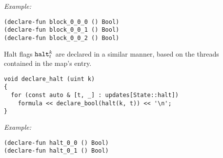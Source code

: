 \noindent
\emph{Example:} 

\begin{lstlisting}[style=smtlib]
(declare-fun block_0_0_0 () Bool)
(declare-fun block_0_0_1 () Bool)
(declare-fun block_0_0_2 () Bool)
\end{lstlisting}



\noindent
Halt flags $\texttt{halt}^k_t$ are declared in a similar manner, based on the threads contained in the  map's  entry.

\newpage
\begin{lstlisting}[style=c++]
void declare_halt (uint k)
{
  for (const auto & [t, _] : updates[State::halt])
    formula << declare_bool(halt(k, t)) << '\n';
}
\end{lstlisting}

\noindent
\emph{Example:} 

\begin{lstlisting}[style=smtlib]
(declare-fun halt_0_0 () Bool)
(declare-fun halt_0_1 () Bool)
\end{lstlisting}







